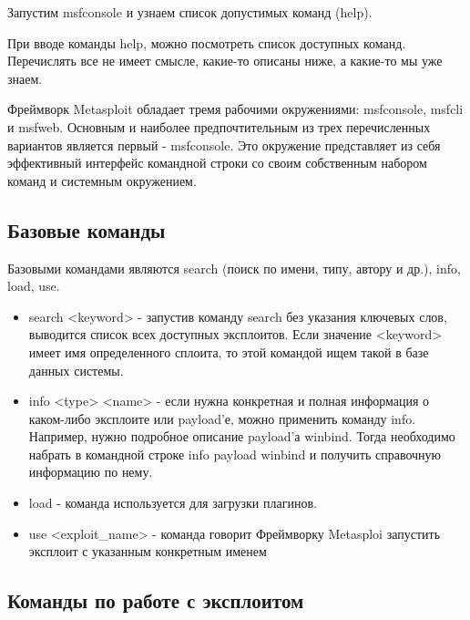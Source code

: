 \documentclass[11pt, a4paper]{article}		%
\begin{document}
Запустим msfconsole и узнаем список допустимых команд (help).

При вводе команды help, можно посмотреть список доступных команд. Перечислять все не имеет смысле, какие-то описаны ниже, а какие-то мы уже знаем.

Фреймворк Metasploit обладает тремя рабочими окружениями: msfconsole, msfcli и msfweb. Основным и наиболее предпочтительным из трех перечисленных вариантов является первый - msfconsole. Это окружение представляет из себя эффективный интерфейс командной строки со своим собственным набором команд и системным окружением.


\subsection{Базовые команды}

Базовыми командами являются search (поиск по имени, типу, автору и др.), info, load, use.

\begin{itemize}
\item search <keyword> - запустив команду search без указания ключевых слов, выводится список всех доступных эксплоитов. Если значение <keyword> имеет имя определенного сплоита, то этой командой ищем такой в базе данных системы.

\item info <type> <name> - если нужна конкретная и полная информация о каком-либо эксплоите или payload’е, можно применить команду info. Например, нужно подробное описание payload’а winbind. Тогда необходимо набрать в командной строке info payload winbind и получить справочную информацию по нему.

\item load - команда используется для загрузки плагинов.

\item use <exploit\_name> - команда говорит Фреймворку Metasploi запустить эксплоит с указанным конкретным именем

\end{itemize}


\subsection{Команды по работе с эксплоитом}
\end{document}
